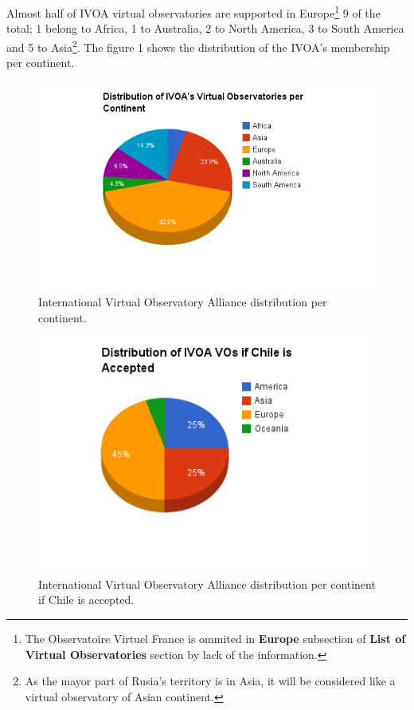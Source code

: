 Almost half of IVOA virtual observatories are supported in Europe\footnote{The
Observatoire Virtuel France is ommited in \textbf{Europe} subsection of
\textbf{List of Virtual Observatories} section by lack of the information.} 9 of
the total; 1 belong to Africa, 1 to Australia, 2 to North America, 3 to South
America and 5 to Asia\footnote{As the mayor part of Rusia's territory is in
Asia, it will be considered like a virtual observatory of Asian continent.}. The
figure 1 shows the distribution of the IVOA's membership per continent.\\

\begin{figure}%
\begin{center}
	\includegraphics[scale=0.6]{img/vo_distribution.png}
	\caption{International Virtual Observatory Alliance distribution per
             continent.}
\end{center}
\end{figure}


\begin{figure}%
\begin{center}
	\includegraphics[width=110mm]{img/if_chile.png}
	\caption{International Virtual Observatory Alliance distribution per
             continent if Chile is accepted.}
\end{center}
\end{figure}


